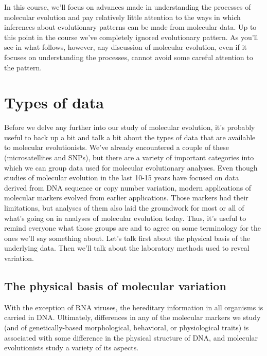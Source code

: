 In this course, we'll focus on advances made in understanding the
processes of molecular evolution and pay relatively little attention
to the ways in which inferences about evolutionary patterns can be
made from molecular data. Up to this point in the course we've
completely ignored evolutionary pattern. As you'll see in what
follows, however, any discussion of molecular evolution, even if it
focuses on understanding the processes, cannot avoid some careful
attention to the pattern.

\section*{Types of data}

Before we delve any further into our study of molecular evolution,
it's probably useful to back up a bit and talk a bit about the types
of data that are available to molecular evolutionists. We've already
encountered a couple of these (microsatellites and SNPs), but there
are a variety of important categories into which we can group data
used for molecular evolutionary analyses. Even though studies of
molecular evolution in the last 10-15 years have focused on data
derived from DNA sequence or copy number variation, modern
applications of molecular markers evolved from earlier
applications. Those markers had their limitations, but analyses of
them also laid the groundwork for most or all of what's going on in
analyses of molecular evolution today. Thus, it's useful to remind
everyone what those groups are and to agree on some terminology for
the ones we'll say something about. Let's talk first about the
physical basis of the underlying data. Then we'll talk about the
laboratory methods used to reveal variation.

\subsection*{The physical basis of molecular variation}

With the exception of RNA viruses, the hereditary information in all
organisms is carried in DNA. Ultimately, differences in any of the
molecular markers we study (and of genetically-based morphological,
behavioral, or physiological traits) is associated with some
difference in the physical structure of DNA, and molecular
evolutionists study a variety of its aspects.


